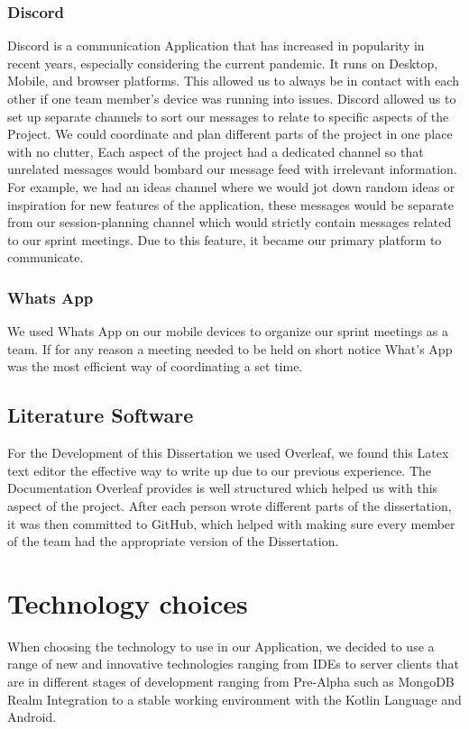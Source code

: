 \subsubsection{Discord} 
Discord is a communication Application that has increased in popularity in recent years, especially considering the current pandemic. It runs on Desktop, Mobile, and browser platforms. This allowed us to always be in contact with each other if one team member's device was running into issues.
\newline
\newline 
Discord allowed us to set up separate channels to sort our messages to relate to specific aspects of the Project. We could coordinate and plan different parts of the project in one place with no clutter, Each aspect of the project had a dedicated channel so that unrelated messages would bombard our message feed with irrelevant information.
\newline
\newline 
For example, we had an ideas channel where we would jot down random ideas or inspiration for new features of the application, these messages would be separate from our session-planning channel which would strictly contain messages related to our sprint meetings. Due to this feature, it became our primary platform to communicate.
\newline
\newline 
\subsubsection{Whats App}
We used Whats App on our mobile devices to organize our sprint meetings as a team. If for any reason a meeting needed to be held on short notice What's App was the most efficient way of coordinating a set time.
\subsection{Literature Software}
For the Development of this Dissertation we used Overleaf, we found this Latex text editor the effective way to write up due to our previous experience. The Documentation Overleaf provides is well structured which helped us with this aspect of the project. After each person wrote different parts of the dissertation, it was then committed to GitHub, which helped with making sure every member of the team had the appropriate version of the Dissertation.

\section{Technology choices}
When choosing the technology to use in our Application, we decided to use a range of new and innovative technologies ranging from IDEs to server clients that are in different stages of development ranging from Pre-Alpha such as MongoDB Realm Integration to a stable working environment with the Kotlin Language and Android.
